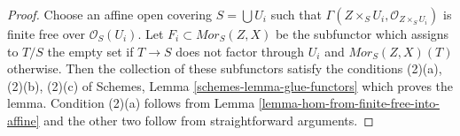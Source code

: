 \documentclass[10pt,a4paper]{amsart}
\theoremstyle{plain}
\theoremstyle{definition}
\theoremstyle{remark}
\numberwithin{equation}{subsection}
\begin{document}
\begin{proof}
Choose an affine open covering $S = \bigcup U_i$ such that
$\Gamma(Z \times_S U_i, \mathcal{O}_{Z \times_S U_i})$ is
finite free over $\mathcal{O}_S(U_i)$. Let $F_i \subset \mathit{Mor}_S(Z, X)$
be the subfunctor which assigns to $T/S$ the empty set if
$T \to S$ does not factor through $U_i$ and $\mathit{Mor}_S(Z, X)(T)$
otherwise. Then the collection of these subfunctors satisfy the conditions
(2)(a), (2)(b), (2)(c) of
Schemes, Lemma \ref{schemes-lemma-glue-functors} which proves the lemma.
Condition (2)(a) follows from
Lemma \ref{lemma-hom-from-finite-free-into-affine}
and the other two follow from straightforward arguments.
\end{proof}
\end{document}
